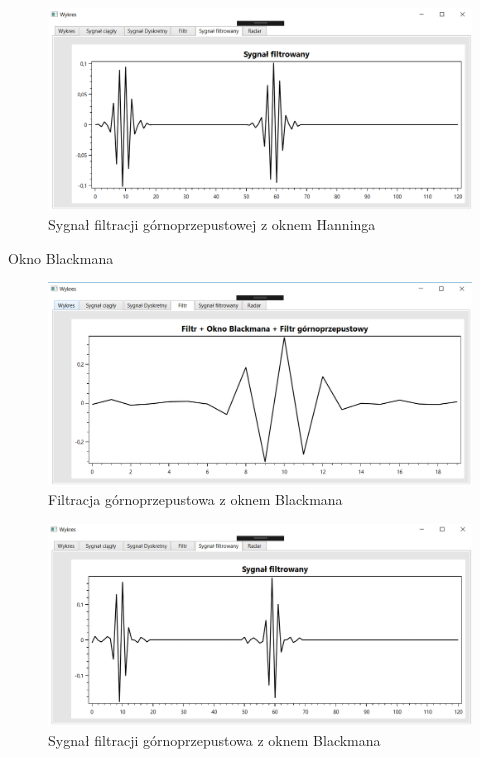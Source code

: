 \documentclass[12pt]{article}
\begin{document}
\begin{figure}[h!]
 \centering
 \includegraphics[width=12.3cm]{prostSFGHn.PNG}
 \vspace{-0.3cm}
 \caption{Sygnał filtracji górnoprzepustowej z oknem Hanninga}
 \label{qwe}
\end{figure}

Okno Blackmana
\begin{figure}[h!]
 \centering
 \includegraphics[width=12.3cm]{prostFGOB.PNG}
 \vspace{-0.3cm}
 \caption{Filtracja górnoprzepustowa z oknem Blackmana}
 \label{werty}
\end{figure}
\newpage

\begin{figure}[h!]
 \centering
 \includegraphics[width=12.3cm]{prostSFGB.PNG}
 \vspace{-0.3cm}
 \caption{Sygnał filtracji górnoprzepustowa z oknem Blackmana}
 \label{joi}
\end{figure}
\end{document}
